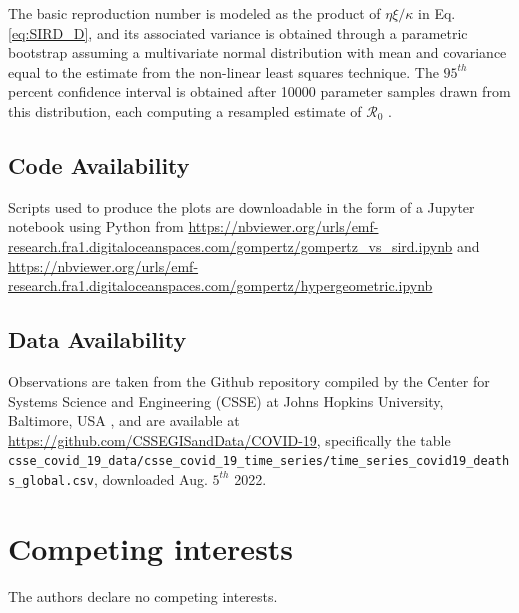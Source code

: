 \documentclass{article}
\begin{document}

The basic reproduction number is modeled as the product of $\eta \xi / \kappa$ in Eq. \ref{eq:SIRD_D}, and its associated variance is obtained through a parametric bootstrap assuming a multivariate normal distribution with mean and covariance equal to the estimate from the non-linear least squares technique. The $95^{th}$ percent confidence interval is obtained after 10000 parameter samples drawn from this distribution, each computing a resampled estimate of $\mathcal{R}_0$ \cite{efron2012bayesian}.

\subsection*{Code Availability}

Scripts used to produce the plots are downloadable in the form of a Jupyter notebook using Python from 
\newline
\url{https://nbviewer.org/urls/emf-research.fra1.digitaloceanspaces.com/gompertz/gompertz_vs_sird.ipynb}
and 
\url{https://nbviewer.org/urls/emf-research.fra1.digitaloceanspaces.com/gompertz/hypergeometric.ipynb}

\subsection*{Data Availability}
Observations are taken from the Github repository compiled by the Center for Systems Science and Engineering (CSSE) at Johns Hopkins University, Baltimore,
USA \cite{dong2020interactive}, and are available at \url{https://github.com/CSSEGISandData/COVID-19}, specifically the table \newline\verb|csse_covid_19_data/csse_covid_19_time_series/time_series_covid19_deaths_global.csv|, \newline downloaded Aug. $5^{th}$ 2022.

\section*{Competing interests}
The authors declare no competing interests.
\end{document}
